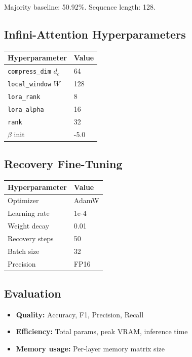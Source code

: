 Majority baseline: 50.92\%. Sequence length: 128.

\subsection{Infini-Attention Hyperparameters}

\begin{table}[H]
\centering
\small
\begin{tabular}{ll}
\toprule
\textbf{Hyperparameter} & \textbf{Value} \\
\midrule
\texttt{compress\_dim} $d_c$ & 64 \\
\texttt{local\_window} $W$ & 128 \\
\texttt{lora\_rank} & 8 \\
\texttt{lora\_alpha} & 16 \\
\texttt{rank} & 32 \\
$\beta$ init & -5.0 \\
\bottomrule
\end{tabular}
\end{table}

\subsection{Recovery Fine-Tuning}

\begin{table}[H]
\centering
\small
\begin{tabular}{ll}
\toprule
\textbf{Hyperparameter} & \textbf{Value} \\
\midrule
Optimizer & AdamW \\
Learning rate & 1e-4 \\
Weight decay & 0.01 \\
Recovery steps & 50 \\
Batch size & 32 \\
Precision & FP16 \\
\bottomrule
\end{tabular}
\end{table}

\subsection{Evaluation}

\begin{itemize}
\item \textbf{Quality:} Accuracy, F1, Precision, Recall
\item \textbf{Efficiency:} Total params, peak VRAM, inference time
\item \textbf{Memory usage:} Per-layer memory matrix size

\end{itemize}
